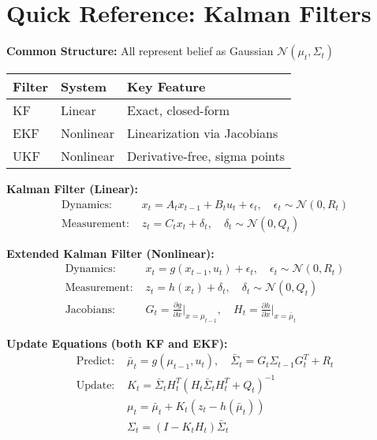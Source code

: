 
\section{Quick Reference: Kalman Filters}

\begin{tcolorbox}[colback=yellow!10!white,colframe=orange!75!black,title=\textbf{Kalman Filter Family - Fast Reference}]

\textbf{Common Structure:} All represent belief as Gaussian $\mathcal{N}(\mu_t, \Sigma_t)$

\vspace{2mm}
\begin{tabular}{|l|l|l|}
\hline
\textbf{Filter} & \textbf{System} & \textbf{Key Feature} \\
\hline
KF & Linear & Exact, closed-form \\
EKF & Nonlinear & Linearization via Jacobians \\
UKF & Nonlinear & Derivative-free, sigma points \\
\hline
\end{tabular}

\vspace{3mm}
\textbf{Kalman Filter (Linear):}
\begin{align*}
\text{Dynamics: } & x_t = A_t x_{t-1} + B_t u_t + \epsilon_t, \quad \epsilon_t \sim \mathcal{N}(0, R_t) \\
\text{Measurement: } & z_t = C_t x_t + \delta_t, \quad \delta_t \sim \mathcal{N}(0, Q_t)
\end{align*}

\textbf{Extended Kalman Filter (Nonlinear):}
\begin{align*}
\text{Dynamics: } & x_t = g(x_{t-1}, u_t) + \epsilon_t, \quad \epsilon_t \sim \mathcal{N}(0, R_t) \\
\text{Measurement: } & z_t = h(x_t) + \delta_t, \quad \delta_t \sim \mathcal{N}(0, Q_t) \\
\text{Jacobians: } & G_t = \frac{\partial g}{\partial x}\bigg|_{x=\mu_{t-1}}, \quad H_t = \frac{\partial h}{\partial x}\bigg|_{x=\bar{\mu}_t}
\end{align*}

\textbf{Update Equations (both KF and EKF):}
\begin{align*}
\text{Predict: } & \bar{\mu}_t = g(\mu_{t-1}, u_t), \quad \bar{\Sigma}_t = G_t \Sigma_{t-1} G_t^T + R_t \\
\text{Update: } & K_t = \bar{\Sigma}_t H_t^T (H_t \bar{\Sigma}_t H_t^T + Q_t)^{-1} \\
& \mu_t = \bar{\mu}_t + K_t (z_t - h(\bar{\mu}_t)) \\
& \Sigma_t = (I - K_t H_t)\bar{\Sigma}_t
\end{align*}

\end{tcolorbox}


